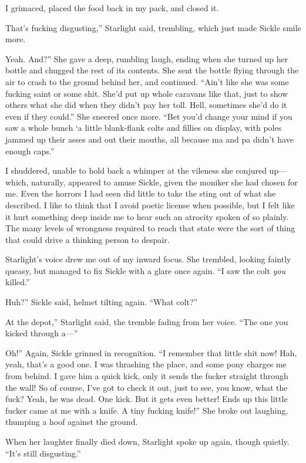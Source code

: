 I grimaced, placed the food back in my pack, and closed it.

\leavevmode{}That’s fucking disgusting,” Starlight said, trembling, which just made Sickle smile more.

\leavevmode{}Yeah. And?” She gave a deep, rumbling laugh, ending when she turned up her bottle and chugged the rest of its contents. She sent the bottle flying through the air to crash to the ground behind her, and continued. “Ain’t like she was some fucking saint or some shit. She’d put up whole caravans like that, just to show others what she did when they didn’t pay her toll. Hell, sometimes she’d do it even if they could.” She sneered once more. “Bet you’d change your mind if you saw a whole bunch ‘a little blank-flank colts and fillies on display, with poles jammed up their asses and out their mouths, all because ma and pa didn’t have enough caps.”

I shuddered, unable to hold back a whimper at the vileness she conjured up—which, naturally, appeared to amuse Sickle, given the moniker she had chosen for me. Even the horrors I had seen did little to take the sting out of what she described. I like to think that I avoid poetic license when possible, but I felt like it hurt something deep inside me to hear such an atrocity spoken of so plainly. The many levels of wrongness required to reach that state were the sort of thing that could drive a thinking person to despair.

Starlight’s voice drew me out of my inward focus. She trembled, looking faintly queasy, but managed to fix Sickle with a glare once again. “I saw the colt \textit{you} killed.”

\leavevmode{}Huh?” Sickle said, helmet tilting again. “What colt?”

\leavevmode{}At the depot,” Starlight said, the tremble fading from her voice. “The one you kicked through a—”

\leavevmode{}Oh!” Again, Sickle grinned in recognition. “I remember that little shit now! Hah, yeah, that’s a good one. I was thrashing the place, and some pony charges me from behind. I gave him a quick kick, only it sends the fucker straight through the wall! So of course, I’ve got to check it out, just to see, you know, what the fuck? Yeah, he was dead. One kick. But it gets even better! Ends up this little fucker came at me with a knife. A tiny fucking knife!” She broke out laughing, thumping a hoof against the ground.

When her laughter finally died down, Starlight spoke up again, though quietly. “It’s still disgusting.”

